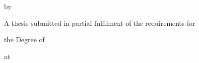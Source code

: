 \begin{titlepage}
\thispagestyle{empty}
\setlength{\parskip}{0pt}
\begin{center}

{\fontsize{14pt}{18pt}\selectfont\bfseries
\parbox{0.82\textwidth}{\centering\MakeUppercase{\ttitle}}\par}

\vspace*{108pt}

{\fontsize{14pt}{18pt}\selectfont by\par}

\vspace*{46pt}

{\fontsize{14pt}{18pt}\selectfont\bfseries \authorname\par}
\ifblank{\previousdegrees}{}{%
	{\fontsize{14pt}{18pt}\selectfont \previousdegrees\par}%
}

\vspace*{74pt}

{\fontsize{12pt}{18pt}\selectfont \deptname\par}
{\fontsize{12pt}{18pt}\selectfont \univname\par}

\vfill

{\fontsize{12pt}{18pt}\selectfont A thesis submitted in partial fulfilment of the requirements for\par}
{\fontsize{12pt}{18pt}\selectfont the Degree of \degreename\par}
{\fontsize{12pt}{18pt}\selectfont at \univname\par}

\vspace*{12pt}

{\fontsize{12pt}{18pt}\selectfont \submissionmonthyear\par}

\vspace*{10pt}
\end{center}
\end{titlepage}
